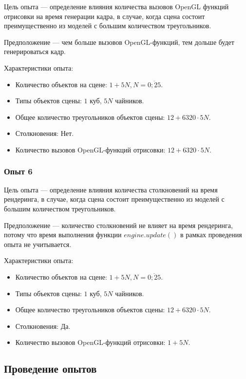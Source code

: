 Цель опыта --- определение влияния количества вызовов OpenGL функций отрисовки на время генерации кадра, в случае, когда сцена состоит преимущественно из моделей с большим количеством треугольников.

Предположение --- чем больше вызовов OpenGL-функций, тем дольше будет генерироваться кадр.

Характеристики опыта:
\begin{itemize}
    \item Количество объектов на сцене: $1 + 5 N, N = \overline{0; 25}$.
    \item Типы объектов сцены: $1$ куб, $5 N$ чайников.
    \item Общее количество треугольников объектов сцены: $12 + 6320 \cdot 5 N$.
    \item Столкновения: Нет.
    \item Количество вызовов OpenGL-функций отрисовки: $12 + 6320 \cdot 5 N$.
\end{itemize}

\subsubsection{Опыт 6}

Цель опыта --- определение влияния количества столкновений на время рендеринга, в случае, когда сцена состоит преимущественно из моделей с большим количеством треугольников.

Предположение --- количество столкновений не влияет на время рендеринга, потому что время выполнения функции $engine.update()$ в рамках проведения опыта не учитывается.

Характеристики опыта:
\begin{itemize}
    \item Количество объектов на сцене: $1 + 5 N, N = \overline{0; 25}$.
    \item Типы объектов сцены: $1$ куб, $5 N$ чайников.
    \item Общее количество треугольников объектов сцены: $12 + 6320 \cdot 5 N$.
    \item Столкновения: Да.
    \item Количество вызовов OpenGL-функций отрисовки: $1 + 5 N$.
\end{itemize}

\subsection{Проведение опытов}


